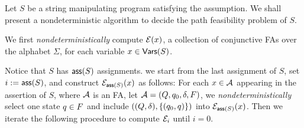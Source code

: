 
Let $S$ be a string manipulating program satisfying the \prerec{} assumption. 
We shall present a nondeterministic algorithm to decide the path feasibility problem of $S$. 

We first \emph{nondeterministically} compute $\mathcal{E}(x)$, a collection of conjunctive FAs over the alphabet $\Sigma$, for each variable $x \in \mathsf{Vars}(S)$. %

  


Notice that $S$ has $\mathsf{ass}(S)$ assignments. we start from the last assignment of $S$,  set $i:=\mathsf{ass}(S)$, and construct $\mathcal{E}_{\mathsf{ass}(S)}(x)$ as follows: For each %
$x \in \mathcal{A}$ appearing in the assertion of $S$, where $\mathcal{A}$ is an FA, let $\mathcal{A} = (Q, q_0, \delta, F)$, we \emph{nondeterministically} select one state $q \in F$ and include $((Q, \delta), \{(q_0, q)\})$ into $\mathcal{E}_{\mathsf{ass}(S)}(x)$. Then we iterate the following procedure to compute $\mathcal{E}_{i}$ until $i=0$.  
%

